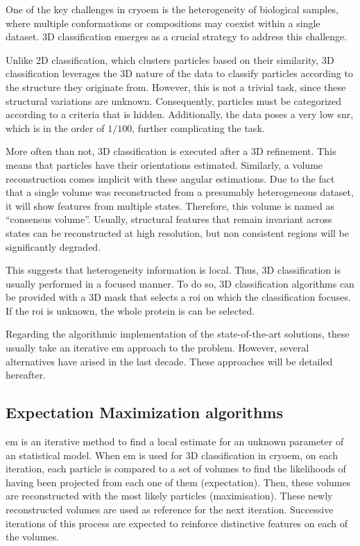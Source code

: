\documentclass[../main.tex]{subfiles}
\begin{document}
One of the key challenges in \gls{cryoem} is the heterogeneity of biological samples, where multiple conformations or compositions may coexist within a single dataset. 3D classification emerges as a crucial strategy to address this challenge.

Unlike 2D classification, which clusters particles based on their similarity, 3D classification leverages the 3D nature of the data to classify particles according to the structure they originate from. However, this is not a trivial task, since these structural variations are unknown. Consequently, particles must be categorized according to a criteria that is hidden. Additionally, the data poses a very low \gls{snr}, which is in the order of $1/100$, further complicating the task\cite{nogales2015}.

More often than not, 3D classification is executed after a 3D refinement. This means that particles have their orientations estimated. Similarly, a volume reconstruction comes implicit with these angular estimations. Due to the fact that a single volume was reconstructed from a presumably heterogeneous dataset, it will show features from multiple states. Therefore, this volume is named as ``consensus volume''. Usually, structural features that remain invariant across states can be reconstructed at high resolution, but non consistent regions will be significantly degraded\cite{herreros2021}.

This suggests that heterogeneity information is local. Thus, 3D classification is usually performed in a focused manner. To do so, 3D classification algorithms can be provided with a 3D mask that selects a \gls{roi} on which the classification focuses. If the \gls{roi} is unknown, the whole protein is can be selected.

Regarding the algorithmic implementation of the state-of-the-art solutions, these usually take an iterative \gls{em} approach to the problem. However, several alternatives have arised in the last decade. These approaches will be detailed hereafter.

\subsection{Expectation Maximization algorithms}
\Gls{em} is an iterative method to find a local estimate for an unknown parameter of an statistical model\cite{meng1997}. When \gls{em} is used for 3D classification in \gls{cryoem}, on each iteration, each particle is compared to a set of volumes to find the likelihoods of having been projected from each one of them (expectation). Then, these volumes are reconstructed with the most likely particles (maximisation). These newly reconstructed volumes are used as reference for the next iteration. Successive iterations of this process are expected to reinforce distinctive features on each of the volumes\cite{cryosparc}.
\end{document}
